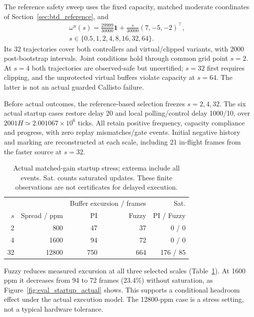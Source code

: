 The reference safety sweep uses the fixed capacity, matched moderate
coordinates of Section~\ref{sec:btd_reference}, and
\begin{align}
 \omega^u(s)=\frac{29999}{30000}\mathbf1
                 +\frac{s}{30000}(7,-5,-2)^\top,\nonumber\\
 s\in\{0.5,1,2,4,8,16,32,64\}.
\end{align}
Its 32 trajectories cover both controllers and virtual/clipped
variants, with 2000 post-bootstrap intervals. Joint conditions hold
through common grid point $s=2$. At $s=4$ both trajectories are
observed-safe but uncertified; $s=32$ first requires clipping, and
the unprotected virtual buffers violate capacity at $s=64$.
The latter is not an actual guarded Callisto failure.

Before actual outcomes, the reference-based selection freezes
$s=2,4,32$. The six actual startup cases restore delay 20 and local
polling/control delay 1000/10, over $2001H\simeq2.001067\times10^6$
ticks. All retain positive frequency, capacity compliance and progress,
with zero replay mismatches/gate events. Initial negative history and
marking are reconstructed at each scale, including 21 in-flight frames
from the faster source at $s=32$.

\begin{table}[t]
\caption{Actual matched-gain startup stress; extrema include all events.
Sat. counts saturated updates. These finite observations are not
certificates for delayed execution.}
\label{tab:eval_startup_safety}
\centering
\begin{tabular}{@{}rrrrr@{}}\toprule
 & & \multicolumn{2}{c}{Buffer excursion / frames} & Sat.\\
$s$ & Spread / ppm & PI & Fuzzy & PI / Fuzzy\\\midrule
2 & 800 & 47 & 37 & 0 / 0\\
4 & 1600 & 94 & 72 & 0 / 0\\
32 & 12800 & 750 & 664 & 176 / 85\\\bottomrule
\end{tabular}
\end{table}

Fuzzy reduces measured excursion at all three selected scales
(Table~\ref{tab:eval_startup_safety}). At 1600 ppm it decreases from
94 to 72 frames (23.4\%) without saturation, as
Figure~\ref{fig:eval_startup_actual} shows. This supports a conditional
headroom effect under the actual execution model. The 12800-ppm case
is a stress setting, not a typical hardware tolerance.

